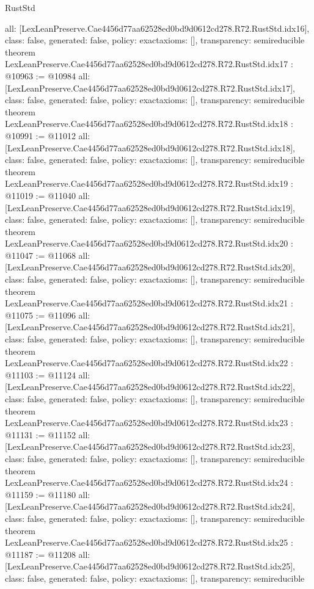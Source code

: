 \begin{lexlean}{RustStd}
\begin{coremodule}
{  all: [LexLeanPreserve.Cae4456d77aa62528ed0bd9d0612cd278.R72.RustStd.idx16],
  class: false,
  generated: false,
  policy: exact{axioms: []},
  transparency: semireducible
}
theorem LexLeanPreserve.Cae4456d77aa62528ed0bd9d0612cd278.R72.RustStd.idx17 : @10963 := @10984 {
  all: [LexLeanPreserve.Cae4456d77aa62528ed0bd9d0612cd278.R72.RustStd.idx17],
  class: false,
  generated: false,
  policy: exact{axioms: []},
  transparency: semireducible
}
theorem LexLeanPreserve.Cae4456d77aa62528ed0bd9d0612cd278.R72.RustStd.idx18 : @10991 := @11012 {
  all: [LexLeanPreserve.Cae4456d77aa62528ed0bd9d0612cd278.R72.RustStd.idx18],
  class: false,
  generated: false,
  policy: exact{axioms: []},
  transparency: semireducible
}
theorem LexLeanPreserve.Cae4456d77aa62528ed0bd9d0612cd278.R72.RustStd.idx19 : @11019 := @11040 {
  all: [LexLeanPreserve.Cae4456d77aa62528ed0bd9d0612cd278.R72.RustStd.idx19],
  class: false,
  generated: false,
  policy: exact{axioms: []},
  transparency: semireducible
}
theorem LexLeanPreserve.Cae4456d77aa62528ed0bd9d0612cd278.R72.RustStd.idx20 : @11047 := @11068 {
  all: [LexLeanPreserve.Cae4456d77aa62528ed0bd9d0612cd278.R72.RustStd.idx20],
  class: false,
  generated: false,
  policy: exact{axioms: []},
  transparency: semireducible
}
theorem LexLeanPreserve.Cae4456d77aa62528ed0bd9d0612cd278.R72.RustStd.idx21 : @11075 := @11096 {
  all: [LexLeanPreserve.Cae4456d77aa62528ed0bd9d0612cd278.R72.RustStd.idx21],
  class: false,
  generated: false,
  policy: exact{axioms: []},
  transparency: semireducible
}
theorem LexLeanPreserve.Cae4456d77aa62528ed0bd9d0612cd278.R72.RustStd.idx22 : @11103 := @11124 {
  all: [LexLeanPreserve.Cae4456d77aa62528ed0bd9d0612cd278.R72.RustStd.idx22],
  class: false,
  generated: false,
  policy: exact{axioms: []},
  transparency: semireducible
}
theorem LexLeanPreserve.Cae4456d77aa62528ed0bd9d0612cd278.R72.RustStd.idx23 : @11131 := @11152 {
  all: [LexLeanPreserve.Cae4456d77aa62528ed0bd9d0612cd278.R72.RustStd.idx23],
  class: false,
  generated: false,
  policy: exact{axioms: []},
  transparency: semireducible
}
theorem LexLeanPreserve.Cae4456d77aa62528ed0bd9d0612cd278.R72.RustStd.idx24 : @11159 := @11180 {
  all: [LexLeanPreserve.Cae4456d77aa62528ed0bd9d0612cd278.R72.RustStd.idx24],
  class: false,
  generated: false,
  policy: exact{axioms: []},
  transparency: semireducible
}
theorem LexLeanPreserve.Cae4456d77aa62528ed0bd9d0612cd278.R72.RustStd.idx25 : @11187 := @11208 {
  all: [LexLeanPreserve.Cae4456d77aa62528ed0bd9d0612cd278.R72.RustStd.idx25],
  class: false,
  generated: false,
  policy: exact{axioms: []},
  transparency: semireducible
}
\end{coremodule}
\end{lexlean}
